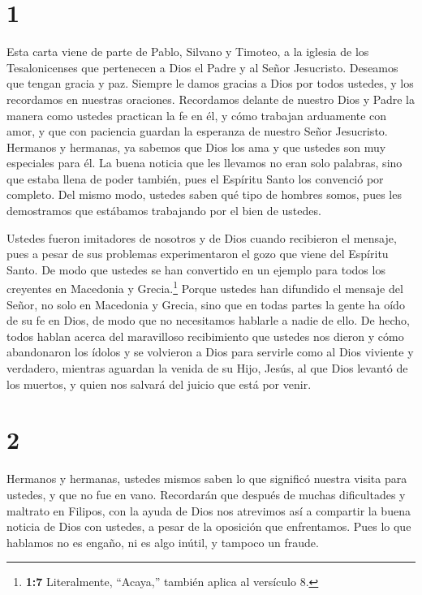 \hypertarget{section}{%
\section{1}\label{section}}

 Esta carta viene de parte de Pablo, Silvano y Timoteo, a la
iglesia de los Tesalonicenses que pertenecen a Dios el Padre y al Señor
Jesucristo. Deseamos que tengan gracia y paz.  Siempre le
damos gracias a Dios por todos ustedes, y los recordamos en nuestras
oraciones.  Recordamos delante de nuestro Dios y Padre la
manera como ustedes practican la fe en él, y cómo trabajan arduamente
con amor, y que con paciencia guardan la esperanza de nuestro Señor
Jesucristo.  Hermanos y hermanas, ya sabemos que Dios los
ama y que ustedes son muy especiales para él.  La buena
noticia que les llevamos no eran solo palabras, sino que estaba llena de
poder también, pues el Espíritu Santo los convenció por completo. Del
mismo modo, ustedes saben qué tipo de hombres somos, pues les
demostramos que estábamos trabajando por el bien de ustedes.

 Ustedes fueron imitadores de nosotros y de Dios cuando
recibieron el mensaje, pues a pesar de sus problemas experimentaron el
gozo que viene del Espíritu Santo.  De modo que ustedes se
han convertido en un ejemplo para todos los creyentes en Macedonia y
Grecia.\footnote{\textbf{1:7} Literalmente, ``Acaya,'' también aplica al
  versículo 8.}  Porque ustedes han difundido el mensaje del
Señor, no solo en Macedonia y Grecia, sino que en todas partes la gente
ha oído de su fe en Dios, de modo que no necesitamos hablarle a nadie de
ello.  De hecho, todos hablan acerca del maravilloso
recibimiento que ustedes nos dieron y cómo abandonaron los ídolos y se
volvieron a Dios para servirle como al Dios viviente y verdadero,
 mientras aguardan la venida de su Hijo, Jesús, al que Dios
levantó de los muertos, y quien nos salvará del juicio que está por
venir.

\hypertarget{section-1}{%
\section{2}\label{section-1}}

 Hermanos y hermanas, ustedes mismos saben lo que significó
nuestra visita para ustedes, y que no fue en vano. 
Recordarán que después de muchas dificultades y maltrato en Filipos, con
la ayuda de Dios nos atrevimos así a compartir la buena noticia de Dios
con ustedes, a pesar de la oposición que enfrentamos.  Pues
lo que hablamos no es engaño, ni es algo inútil, y tampoco un fraude.

